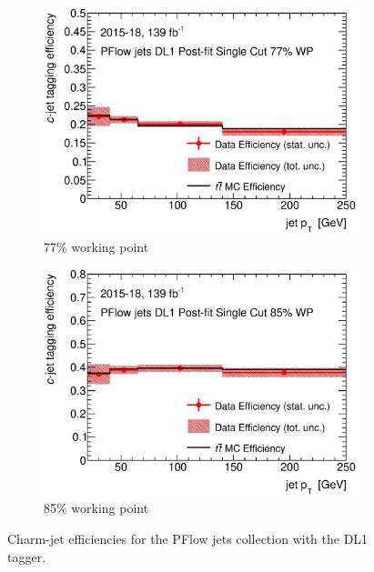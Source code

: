 \documentclass[letterpaper,12pt]{article}
\begin{document}
\begin{figure}[H]
\begin{subfigure}[t]{.35\linewidth}
\includegraphics[width=1\textwidth]{FTAG_plots/DL1allPFlowDec/eff77.eps}
\caption{77\% working point}
\end{subfigure}
\begin{subfigure}[t]{.35\linewidth}
\includegraphics[width=1\textwidth]{FTAG_plots/DL1allPFlowDec/eff85.eps}
\caption{85\% working point}
\end{subfigure}
\caption{Charm-jet efficiencies for the PFlow jets collection with
the DL1 tagger.} \label{fig:Dec_eff_PFlow_DL1}
\end{figure}
\end{document}
